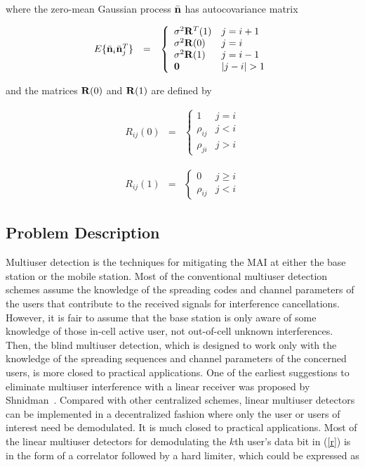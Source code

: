 \documentclass[a4paper,11pt,fleqn]{article}
\newcommand{\bn}{{\bf n}}
\newcommand{\bR}{{\bf R}}
\begin{document}
\noindent where the zero-mean Gaussian process $\bar{\bn}$ has
autocovariance matrix

\begin{equation}
\begin{array}{rcl}
E\{\bar{\bn}_i\bar{\bn}_j^T\}&=&\left\{
\begin{array}{ll}
\sigma^2\bR^T(1)&j=i+1\\ \sigma^2\bR(0)&j=i\\
\sigma^2\bR(1)&j=i-1\\ \mathbf{0}&|j-i|>1
\end{array}\right.
\end{array}
\end{equation}

\noindent and the matrices $\bR(0)$ and $\bR(1)$ are defined by

\begin{equation}
\begin{array}{rcl}
R_{ij}(0)&=&\left\{
\begin{array}{ll}
1&j=i\\ \rho_{ij}&j<i\\ \rho_{ji}&j>i
\end{array}\right.
\end{array}
\end{equation}

\begin{equation}
\begin{array}{rcl}
R_{ij}(1)&=&\left\{
\begin{array}{ll}
0&j\geq i\\ \rho_{ij}&j<i
\end{array}\right.
\end{array}
\end{equation}

\subsection{Problem Description}

Multiuser detection is the techniques for mitigating the MAI at
either the base station or the mobile station. Most of the
conventional multiuser detection schemes assume the knowledge of
the spreading codes and channel parameters of the users that
contribute to the received signals for interference cancellations.
However, it is fair to assume that the base station is only aware
of some knowledge of those in-cell active user, not out-of-cell
unknown interferences. Then, the blind multiuser detection, which
is designed to work only with the knowledge of the spreading
sequences and channel parameters of the concerned users, is more
closed to practical applications. One of the earliest suggestions
to eliminate multiuser interference with a linear receiver was
proposed by Shnidman~\cite{Shni67}. Compared with other
centralized schemes, linear multiuser detectors can be implemented
in a decentralized fashion where only the user or users of
interest need be demodulated. It is much closed to practical
applications. Most of the linear multiuser detectors for
demodulating the $k$th user's data bit in (\ref{r}) is in the form
of a correlator followed by a hard limiter, which could be
expressed as
\end{document}

